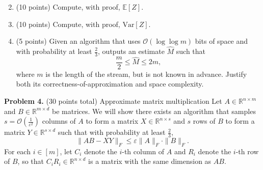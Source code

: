 \documentclass[11pt]{article}
\newcommand{\Ex}[1]{\ensuremath{\mathbb{E}\left[#1\right]}}
\newcommand{\Var}[1]{\ensuremath{\text{Var}\left[#1\right]}}
\newcommand{\eps}{\varepsilon}
\begin{document}
\begin{enumerate}
\setcounter{enumi}{1}
\item (10 points)
Compute, with proof, $\Ex{Z}$. 
\item (10 points)
Compute, with proof, $\Var{Z}$. 
\item (5 points)
Given an algorithm that uses $\mathcal{O}(\log\log m)$ bits of space and with probability at least $\frac{2}{3}$, outputs an estimate $\widehat{M}$ such that
\[\frac{m}{2}\le\widehat{M}\le 2m,\]
where $m$ is the length of the stream, but is not known in advance. 
Justify both its correctness-of-approximation and space complexity. 
\end{enumerate}

\vskip 0.2in\noindent
\textbf{Problem 4.} (30 points total)
Approximate matrix multiplication
\vskip 0.1in\noindent
Let $A\in\mathbb{R}^{n\times m}$ and $B\in\mathbb{R}^{m\times d}$ be matrices. 
We will show there exists an algorithm that samples $s=\mathcal{O}\left(\frac{1}{\eps^2}\right)$ columns of $A$ to form a matrix $X\in\mathbb{R}^{n\times s}$ and $s$ rows of $B$ to form a matrix $Y\in\mathbb{R}^{s\times d}$ such that with probability at least $\frac{2}{3}$,
\[\|AB-XY\|_F\le\eps\|A\|_F\cdot\|B\|_F.\]
\vskip 0.1in\noindent
For each $i\in[m]$, let $C_i$ denote the $i$-th column of $A$ and $R_i$ denote the $i$-th row of $B$, so that $C_iR_i\in\mathbb{R}^{n\times d}$ is a matrix with the same dimension as $AB$. 
\begin{enumerate}

\end{enumerate}
\end{document}
